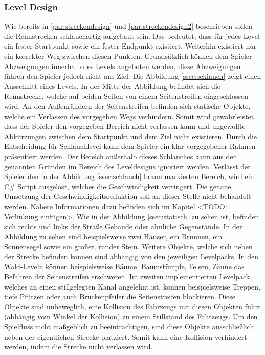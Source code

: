 	\subsubsection{Level Design}
		Wie bereits in \ref{par:streckendesign} und \ref{par:streckendesign2} beschrieben sollen die Rennstrecken schlauchartig aufgebaut sein. Das bedeutet, dass für jedes Level ein fester Startpunkt sowie ein fester Endpunkt existiert. Weiterhin existiert nur ein korrekter Weg zwischen diesen Punkten. Grundsätzlich können dem Spieler Abzweigungen innerhalb des Levels angeboten werden, diese Abzweigungen führen den Spieler jedoch nicht ans Ziel.
		Die Abbildung \ref{ssec:schlauch} zeigt einen Ausschnitt eines Levels. In der Mitte der Abbildung befindet sich die Rennstrecke, welche auf beiden Seiten von einem Seitenstreifen eingeschlossen wird. An den Außenrändern der Seitenstreifen befinden sich statische Objekte, welche ein Verlassen des vorgegeben Wegs verhindern. Somit wird gewährleistet, dass der Spieler den vorgegeben Bereich nicht verlassen kann und ungewollte Abkürzungen zwischen dem Startpunkt und dem Ziel nicht existieren. Durch die Entscheidung für Schlauchlevel kann dem Spieler ein klar vorgegebener Rahmen präsentiert werden. Der Bereich außerhalb dieses Schlauches kann aus den genannten Gründen im Bereich des Leveldesigns ignoriert werden. Verlässt der Spieler den in der Abbildung \ref{ssec:schlauch} braun markierten Bereich, wird ein C\# Script ausgelöst, welches die Geschwindigkeit verringert. Die genaue Umsetzung der Geschwindigkeitsreduktion soll an dieser Stelle nicht behandelt werden. Nähere Informationen dazu befinden sich im Kapitel <TODO: Verlinkung einfügen>.
		Wie in der Abbildung \ref{ssec:statisch} zu sehen ist, befinden sich rechts und links der Straße Gebäude oder ähnliche Gegenstände. In der Abbildung zu sehen sind beispielsweise zwei Häuser, ein Brunnen, ein Sonnensegel sowie ein großer, runder Stein. Weitere Objekte, welche sich neben der Strecke befinden können sind abhängig von den jeweiligen Levelpacks. In den Wald-Leveln können beispielsweise Bäume, Baumstümpfe, Felsen, Zäune das Befahren der Seitenstreifen erschweren. Im zweiten implementierten Levelpack, welches an einen stillgelegten Kanal angelehnt ist, können beispielsweise Treppen, tiefe Pfützen oder auch Brückenpfeiler die Seitenstreifen blockieren. Diese Objekte sind unbeweglich, eine Kollision des Fahrzeugs mit diesen Objekten führt (abhängig vom Winkel der Kollision) zu einem Stillstand des Fahrzeugs. Um den Spielfluss nicht maßgeblich zu beeinträchtigen, sind diese Objekte ausschließlich neben der eigentlichen Strecke platziert. Somit kann eine Kollision verhindert werden, indem die Strecke nicht verlassen wird.
